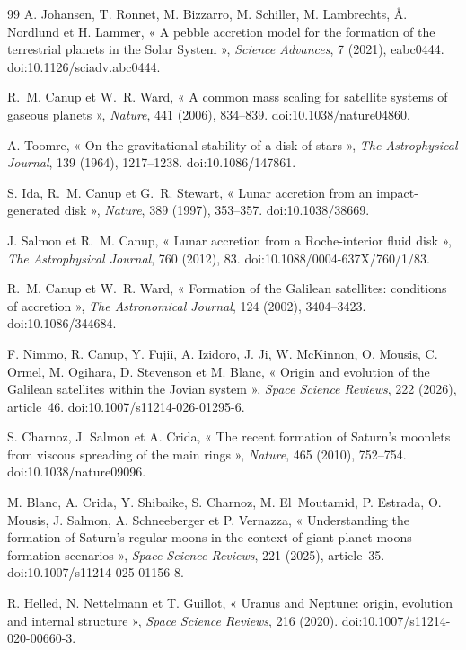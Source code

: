 \documentclass[11pt,a4paper,openany]{report}
\begin{document}
\begin{thebibliography}{99}
 A. Johansen, T. Ronnet, M. Bizzarro, M. Schiller, M. Lambrechts,
Å. Nordlund et H. Lammer, « A pebble accretion model for the formation of the terrestrial planets
in the Solar System », \emph{Science Advances}, 7 (2021), eabc0444. doi:10.1126/sciadv.abc0444.

 R.~M. Canup et W.~R. Ward, « A common mass scaling for satellite systems
of gaseous planets », \emph{Nature}, 441 (2006), 834--839. doi:10.1038/nature04860.

 A. Toomre, « On the gravitational stability of a disk of stars »,
\emph{The Astrophysical Journal}, 139 (1964), 1217--1238. doi:10.1086/147861.

 S. Ida, R.~M. Canup et G.~R. Stewart, « Lunar accretion from an impact-generated
disk », \emph{Nature}, 389 (1997), 353--357. doi:10.1038/38669.

 J. Salmon et R.~M. Canup, « Lunar accretion from a Roche-interior fluid
disk », \emph{The Astrophysical Journal}, 760 (2012), 83. doi:10.1088/0004-637X/760/1/83.

 R.~M. Canup et W.~R. Ward, « Formation of the Galilean satellites:
conditions of accretion », \emph{The Astronomical Journal}, 124 (2002), 3404--3423.
doi:10.1086/344684.

 F. Nimmo, R. Canup, Y. Fujii, A. Izidoro, J. Ji, W. McKinnon, O. Mousis,
C. Ormel, M. Ogihara, D. Stevenson et M. Blanc, « Origin and evolution of the Galilean satellites
within the Jovian system », \emph{Space Science Reviews}, 222 (2026), article~46.
doi:10.1007/s11214-026-01295-6.

 S. Charnoz, J. Salmon et A. Crida, « The recent formation of Saturn's
moonlets from viscous spreading of the main rings », \emph{Nature}, 465 (2010), 752--754.
doi:10.1038/nature09096.

 M. Blanc, A. Crida, Y. Shibaike, S. Charnoz, M. El~Moutamid, P. Estrada,
O. Mousis, J. Salmon, A. Schneeberger et P. Vernazza, « Understanding the formation of Saturn's
regular moons in the context of giant planet moons formation scenarios », \emph{Space Science
Reviews}, 221 (2025), article~35. doi:10.1007/s11214-025-01156-8.

 R. Helled, N. Nettelmann et T. Guillot, « Uranus and Neptune: origin,
evolution and internal structure », \emph{Space Science Reviews}, 216 (2020).
doi:10.1007/s11214-020-00660-3.


\end{thebibliography}
\end{document}
